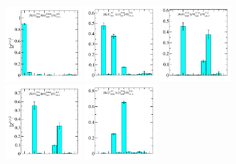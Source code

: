 \begin{figure}
  \includegraphics[width=0.3\textwidth]{figures/spectrum_a1g/no_tq/zfactors/zfactor_isodoublet_kaon_pion-A1g_1-P000-A1u-SS_0-P000-A1um-SS_0.pdf}
  \includegraphics[width=0.28\textwidth]{figures/spectrum_a1g/no_tq/zfactors/zfactor_isodoublet_kaon_pion-A1g_1-P001-A2-SS_1-P00-1-A2m-SS_1.pdf}
  \includegraphics[width=0.28\textwidth]{figures/spectrum_a1g/no_tq/zfactors/zfactor_isodoublet_kaon_eta-A1g_1-P000-A1u-SS_0-P000-A1up-SS_0.pdf}\\
  \includegraphics[width=0.3\textwidth]{figures/spectrum_a1g/no_tq/zfactors/zfactor_isodoublet_kaon_phi-A1g_1-P000-A1u-SS_0-P000-A1up-SS_0.pdf}
  \includegraphics[width=0.28\textwidth]{figures/spectrum_a1g/no_tq/zfactors/zfactor_isodoublet_kaon_pion-A1g_1-P011-A2-SS_0-P0-1-1-A2m-SS_0.pdf}

\end{figure}
